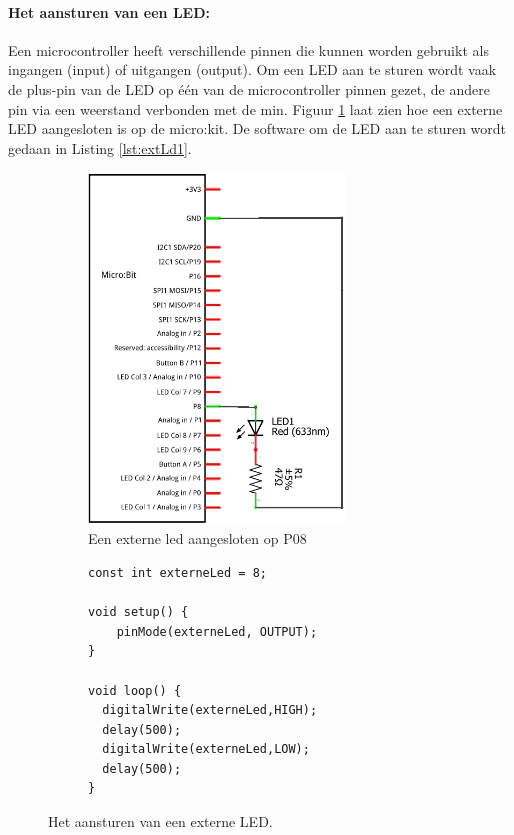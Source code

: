 \paragraph{Het aansturen van een LED:}
Een microcontroller heeft verschillende pinnen die kunnen worden gebruikt als ingangen (input) of uitgangen (output). 
Om een LED aan te sturen wordt vaak de plus-pin van de LED op één van de microcontroller pinnen gezet, de andere pin via een weerstand verbonden met de min. Figuur \ref{fig:exLd} laat zien hoe een externe LED aangesloten is op de micro:kit. De software om de LED  aan te sturen wordt gedaan in Listing \ref{lst:extLd1}.
\begin{figure}[H]
	
	\centering
	\begin{center} 	
		\begin{subfigure}[b]{0.43\textwidth}
			\includegraphics[width=0.75\textwidth]{figuren/externeLedCr}
			\caption{Een externe led aangesloten op P08 }
			\label{fig:exLd}
			
		\end{subfigure}
		\begin{subfigure}[b]{0.46\textwidth}
\begin{lstlisting}[caption={Het aansturen van een externe LED.},label={lst:extLd1}]
const int externeLed = 8;
			
void setup() {
	pinMode(externeLed, OUTPUT);  
}
				
void loop() {
  digitalWrite(externeLed,HIGH);
  delay(500);
  digitalWrite(externeLed,LOW);
  delay(500); 
}
\end{lstlisting}
		\end{subfigure}
		\captionsetup{justification=centering}
		\caption{Het aansturen van een externe LED. }
		\label{fig:vbExtld}
	\end{center}	
\end{figure}
